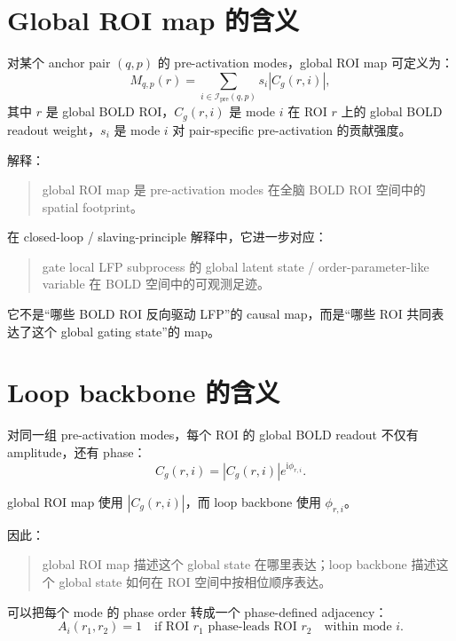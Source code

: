 \documentclass[11pt,a4paper]{ctexart}
\begin{document}
\section{Global ROI map 的含义}

对某个 anchor pair $(q,p)$ 的 pre-activation modes，global ROI map 可定义为：
\begin{equation}
    M_{q,p}(r)
    =
    \sum_{i\in\mathcal I_{\mathrm{pre}}(q,p)} s_i |C_g(r,i)|,
\end{equation}
其中 $r$ 是 global BOLD ROI，$C_g(r,i)$ 是 mode $i$ 在 ROI $r$ 上的 global BOLD readout weight，$s_i$ 是 mode $i$ 对 pair-specific pre-activation 的贡献强度。

解释：
\begin{quote}
    global ROI map 是 pre-activation modes 在全脑 BOLD ROI 空间中的 spatial footprint。
\end{quote}

在 closed-loop / slaving-principle 解释中，它进一步对应：
\begin{quote}
    gate local LFP subprocess 的 global latent state / order-parameter-like variable 在 BOLD 空间中的可观测足迹。
\end{quote}

它不是“哪些 BOLD ROI 反向驱动 LFP”的 causal map，而是“哪些 ROI 共同表达了这个 global gating state”的 map。

\section{Loop backbone 的含义}

对同一组 pre-activation modes，每个 ROI 的 global BOLD readout 不仅有 amplitude，还有 phase：
\begin{equation}
    C_g(r,i)=|C_g(r,i)|e^{\mathrm{i}\phi_{r,i}}.
\end{equation}

global ROI map 使用 $|C_g(r,i)|$，而 loop backbone 使用 $\phi_{r,i}$。

因此：
\begin{quote}
    global ROI map 描述这个 global state 在哪里表达；loop backbone 描述这个 global state 如何在 ROI 空间中按相位顺序表达。
\end{quote}

可以把每个 mode 的 phase order 转成一个 phase-defined adjacency：
\begin{equation}
    A_i(r_1,r_2)=1
    \quad \text{if ROI } r_1 \text{ phase-leads ROI } r_2
    \quad \text{within mode } i.
\end{equation}
\end{document}
